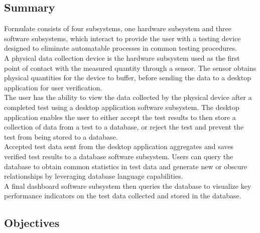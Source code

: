 \documentclass[12pt, titlepage]{article}
\begin{document}
\subsection{Summary}


  Formulate consists of four subsystems, one hardware subsystem and three software subsystems, which interact to provide the user with a testing device designed to eliminate automatable processes in common testing procedures.\\

  A physical data collection device is the hardware subsystem used as the first point of contact with the measured quantity through a sensor. The sensor obtains physical quantities for the device to buffer, before sending the data to a desktop application for user verification.\\

  The user has the ability to view the data collected by the physical device after a completed test using a desktop application software subsystem. The desktop application enables the user to either accept the test results to then store a collection of data from a test to a database, or reject the test and prevent the test from being stored to a database.\\

  Accepted test data sent from the desktop application aggregates and saves verified test results to a database software subsystem. Users can query the database to obtain common statistics in test data and generate new or obscure relationships by leveraging database language capabilities.\\

  A final dashboard software subsystem then queries the database to visualize key performance indicators on the test data collected and stored in the database.\newpage





\subsection{Objectives}

\end{document}
